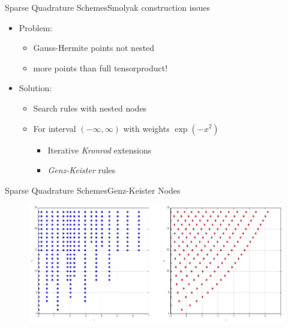 \documentclass{beamer}
\begin{document}
\begin{frame}{Sparse Quadrature Schemes}{Smolyak construction issues}
  \begin{itemize}
    \item Problem:
    \begin{itemize}
      \item Gauss-Hermite points not nested
      \item more points than full tensorproduct!
    \end{itemize}
    \vspace{0.5cm}
    \item Solution:
    \begin{itemize}
      \item Search rules with nested nodes
      \item For interval $(-\infty, \infty)$ with weights $\exp(-x^2)$
      \begin{itemize}
        \item Iterative \emph{Kronrod} extensions
        \item \emph{Genz-Keister} rules
      \end{itemize}
    \end{itemize}
  \end{itemize}
\end{frame}




\begin{frame}{Sparse Quadrature Schemes}{Genz-Keister Nodes}
  \begin{figure}
    \centering
    \includegraphics[width=\linewidth]{./fig/genz_keister_nodes.png}
  \end{figure}
\end{frame}
\end{document}
